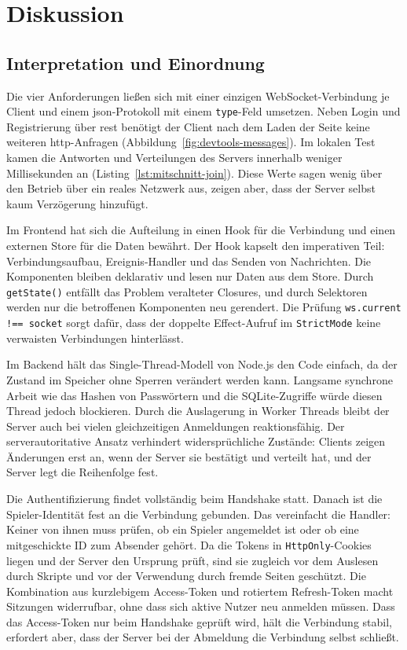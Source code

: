 \chapter{Diskussion}
\label{kap:diskussion}
\verfasser{\autorSE}

\section{Interpretation und Einordnung}
\label{sec:einordnung}

Die vier Anforderungen ließen sich mit einer einzigen WebSocket-Verbindung je Client und einem \gls{json}-Protokoll mit einem \texttt{type}-Feld umsetzen. Neben Login und Registrierung über \gls{rest} benötigt der Client nach dem Laden der Seite keine weiteren \gls{http}-Anfragen (Abbildung~\ref{fig:devtools-messages}). Im lokalen Test kamen die Antworten und Verteilungen des Servers innerhalb weniger Millisekunden an (Listing~\ref{lst:mitschnitt-join}). Diese Werte sagen wenig über den Betrieb über ein reales Netzwerk aus, zeigen aber, dass der Server selbst kaum Verzögerung hinzufügt.

Im Frontend hat sich die Aufteilung in einen Hook für die Verbindung und einen externen Store für die Daten bewährt. Der Hook kapselt den imperativen Teil: Verbindungsaufbau, Ereignis-Handler und das Senden von Nachrichten. Die Komponenten bleiben deklarativ und lesen nur Daten aus dem Store. Durch \texttt{getState()} entfällt das Problem veralteter Closures, und durch Selektoren werden nur die betroffenen Komponenten neu gerendert. Die Prüfung \texttt{ws.current !== socket} sorgt dafür, dass der doppelte Effect-Aufruf im \texttt{StrictMode} keine verwaisten Verbindungen hinterlässt.

Im Backend hält das Single-Thread-Modell von Node.js den Code einfach, da der Zustand im Speicher ohne Sperren verändert werden kann. Langsame synchrone Arbeit wie das Hashen von Passwörtern und die SQLite-Zugriffe würde diesen Thread jedoch blockieren. Durch die Auslagerung in Worker Threads bleibt der Server auch bei vielen gleichzeitigen Anmeldungen reaktionsfähig.
Der serverautoritative Ansatz verhindert widersprüchliche Zustände: Clients zeigen Änderungen erst an, wenn der Server sie bestätigt und verteilt hat, und der Server legt die Reihenfolge fest.

Die Authentifizierung findet vollständig beim Handshake statt. Danach ist die Spieler-Identität fest an die Verbindung gebunden. Das vereinfacht die Handler: Keiner von ihnen muss prüfen, ob ein Spieler angemeldet ist oder ob eine mitgeschickte ID zum Absender gehört. Da die Tokens in \texttt{HttpOnly}-Cookies liegen und der Server den Ursprung prüft, sind sie zugleich vor dem Auslesen durch Skripte und vor der Verwendung durch fremde Seiten geschützt. Die Kombination aus kurzlebigem Access-Token und rotiertem Refresh-Token macht Sitzungen widerrufbar, ohne dass sich aktive Nutzer neu anmelden müssen. Dass das Access-Token nur beim Handshake geprüft wird, hält die Verbindung stabil, erfordert aber, dass der Server bei der Abmeldung die Verbindung selbst schließt.

